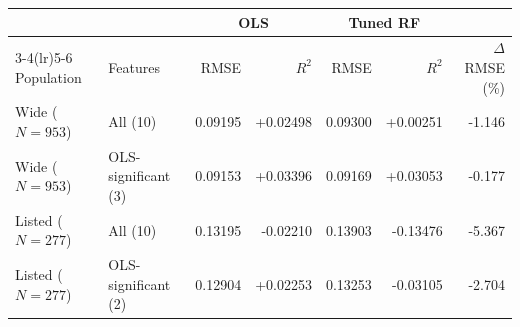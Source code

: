 \begin{tabular}{llrrrrr}
\toprule
 & & \multicolumn{2}{c}{OLS} & \multicolumn{2}{c}{Tuned RF} & \\
\cmidrule(lr){3-4}\cmidrule(lr){5-6}
Population & Features & RMSE & $R^2$ & RMSE & $R^2$ & $\Delta$RMSE (\%) \\
\midrule
Wide ($N=953$) & All (10) & 0.09195 & +0.02498 & 0.09300 & +0.00251 & -1.146 \\
Wide ($N=953$) & OLS-significant (3) & 0.09153 & +0.03396 & 0.09169 & +0.03053 & -0.177 \\
Listed ($N=277$) & All (10) & 0.13195 & -0.02210 & 0.13903 & -0.13476 & -5.367 \\
Listed ($N=277$) & OLS-significant (2) & 0.12904 & +0.02253 & 0.13253 & -0.03105 & -2.704 \\
\bottomrule
\end{tabular}
